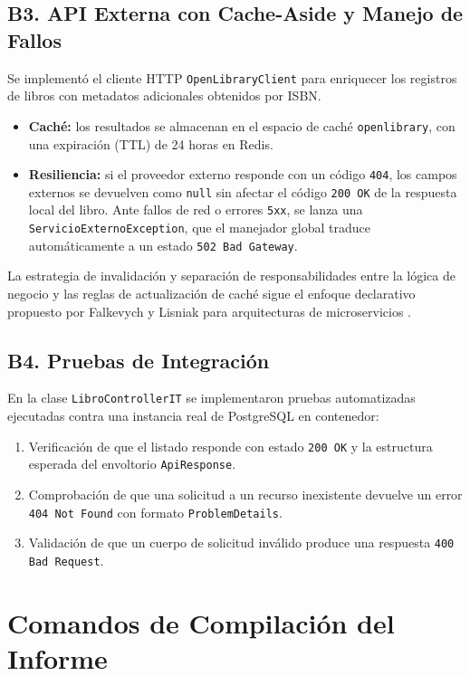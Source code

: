 \documentclass[11pt,a4paper]{article}
\begin{document}
\subsection{B3. API Externa con Cache-Aside y Manejo de Fallos}
Se implementó el cliente HTTP \texttt{OpenLibraryClient} para enriquecer los registros de libros con metadatos adicionales obtenidos por ISBN.
\begin{itemize}
    \item \textbf{Caché:} los resultados se almacenan en el espacio de caché \texttt{openlibrary}, con una expiración (TTL) de 24 horas en Redis.
    \item \textbf{Resiliencia:} si el proveedor externo responde con un código \texttt{404}, los campos externos se devuelven como \texttt{null} sin afectar el código \texttt{200 OK} de la respuesta local del libro. Ante fallos de red o errores \texttt{5xx}, se lanza una \texttt{ServicioExternoException}, que el manejador global traduce automáticamente a un estado \texttt{502 Bad Gateway}.
\end{itemize}
La estrategia de invalidación y separación de responsabilidades entre la lógica de negocio y las reglas de actualización de caché sigue el enfoque declarativo propuesto por Falkevych y Lisniak para arquitecturas de microservicios \cite{falkevych2023invalidation}.

\subsection{B4. Pruebas de Integración}
En la clase \texttt{LibroControllerIT} se implementaron pruebas automatizadas ejecutadas contra una instancia real de PostgreSQL en contenedor:
\begin{enumerate}
    \item Verificación de que el listado responde con estado \texttt{200 OK} y la estructura esperada del envoltorio \texttt{ApiResponse}.
    \item Comprobación de que una solicitud a un recurso inexistente devuelve un error \texttt{404 Not Found} con formato \texttt{ProblemDetails}.
    \item Validación de que un cuerpo de solicitud inválido produce una respuesta \texttt{400 Bad Request}.
\end{enumerate}

\section{Comandos de Compilación del Informe}
\end{document}
